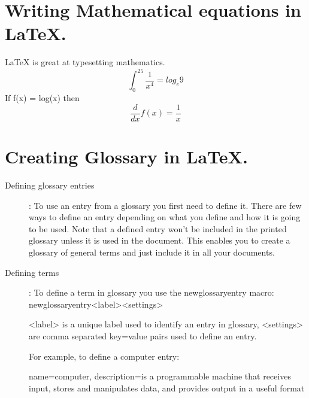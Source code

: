\documentclass[a4paper]{article}
\begin{document}
\section{Writing Mathematical equations in LaTeX.}

\LaTeX{} is great at typesetting mathematics.
\begin{equation}
    \int_0^25\frac{1}{x^4}=log_e9
\end{equation}
   If f(x) = log(x) then
\begin{equation}
    \frac{d}{dx}f(x) = \frac{1}{x}
\end{equation}

\section{Creating Glossary in LaTeX.}
\begin{description}

\item[Defining glossary entries] :
To use an entry from a glossary you first need to define it. There are few ways to define an entry depending on what you define and how it is going to be used.
Note that a defined entry won't be included in the printed glossary unless it is used in the document. This enables you to create a glossary of general terms and just include it in all your documents.

\item[Defining terms] : 
To define a term in glossary you use the newglossaryentry macro:
\\newglossaryentry{<label>}{<settings>}

<label> is a unique label used to identify an entry in glossary, 
<settings> are comma separated key=value pairs used to define an entry.

For example, to define a computer entry:

{
  name=computer, description={is a programmable machine that receives input, stores and manipulates data, and provides output in a useful format}
}

\end{description} 
\end{document}
